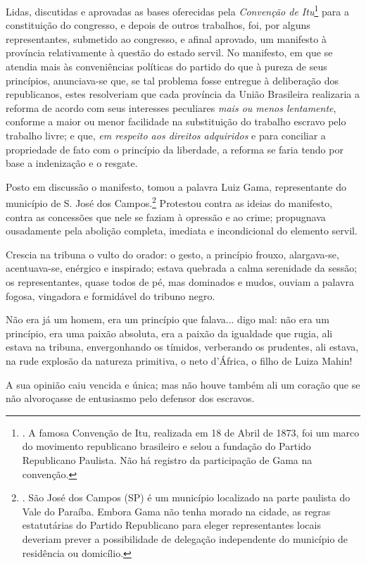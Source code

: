 Lidas, discutidas e aprovadas as bases oferecidas pela \emph{Convenção
de Itu}\footnote{. A famosa Convenção de Itu, realizada em 18 de Abril
  de 1873, foi um marco do movimento republicano brasileiro e selou a
  fundação do Partido Republicano Paulista. Não há registro da
  participação de Gama na convenção.} para a constituição do congresso,
e depois de outros trabalhos, foi, por alguns representantes, submetido
ao congresso, e afinal aprovado, um manifesto à província relativamente
à questão do estado servil. No manifesto, em que se atendia mais às
conveniências políticas do partido do que à pureza de seus princípios,
anunciava-se que, se tal problema fosse entregue à deliberação dos
republicanos, estes resolveriam que cada província da União Brasileira
realizaria a reforma de acordo com seus interesses peculiares \emph{mais
ou menos lentamente}, conforme a maior ou menor facilidade na
substituição do trabalho escravo pelo trabalho livre; e que, \emph{em
respeito aos direitos adquiridos} e para conciliar a propriedade de fato
com o princípio da liberdade, a reforma se faria tendo por base a
indenização e o resgate.

Posto em discussão o manifesto, tomou a palavra Luiz Gama, representante
do município de S. José dos Campos.\footnote{. São José dos Campos (SP)
  é um município localizado na parte paulista do Vale do Paraíba. Embora
  Gama não tenha morado na cidade, as regras estatutárias do Partido
  Republicano para eleger representantes locais deveriam prever a
  possibilidade de delegação independente do município de residência ou
  domicílio.} Protestou contra as ideias do manifesto, contra as
concessões que nele se faziam à opressão e ao crime; propugnava
ousadamente pela abolição completa, imediata e incondicional do elemento
servil.

Crescia na tribuna o vulto do orador: o gesto, a princípio frouxo,
alargava-se, acentuava-se, enérgico e inspirado; estava quebrada a calma
serenidade da sessão; os representantes, quase todos de pé, mas
dominados e mudos, ouviam a palavra fogosa, vingadora e formidável do
tribuno negro.

Não era já um homem, era um princípio que falava... digo mal: não era um
princípio, era uma paixão absoluta, era a paixão da igualdade que rugia,
ali estava na tribuna, envergonhando os tímidos, verberando os
prudentes, ali estava, na rude explosão da natureza primitiva, o neto
d'África, o filho de Luiza Mahin!

A sua opinião caiu vencida e única; mas não houve também ali um coração
que se não alvoroçasse de entusiasmo pelo defensor dos escravos.

